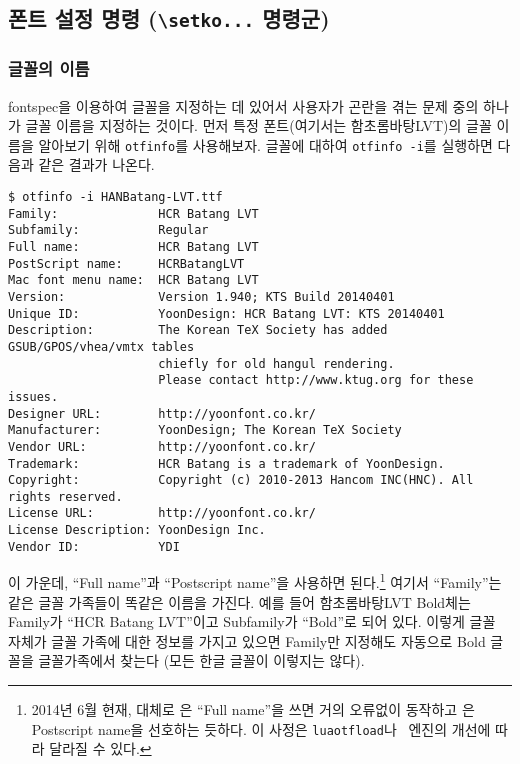 \documentclass[
	12pt,
	a4paper,
	kosection,
	footnote,
	nobookmarks,
	microtype,
]{oblivoir}
\def\cs#1{\texttt{\textbackslash #1}}
\def\util#1{\texttt{#1}}
\def\ct#1{\texttt{#1}}
\newcommand\obclass{ob\-liv\-oir\oblivoirallowbreak}
\begin{document}
\subsection{ 폰트 설정 명령 (\protect\cs{setko...} 명령군)}

\subsubsection{글꼴의 이름}
fontspec을 이용하여 글꼴을 지정하는 데 있어서 사용자가 곤란을 겪는 문제 중의 하나가 글꼴 이름을 
지정하는 것이다. 먼저 특정 폰트(여기서는 함초롬바탕LVT)의 글꼴 이름을 알아보기 위해 \util{otfinfo}를
사용해보자. 글꼴에 대하여 \util{otfinfo -i}를 실행하면 다음과 같은 결과가 나온다.

\begin{footnotesize}
\begin{verbatim}
$ otfinfo -i HANBatang-LVT.ttf
Family:              HCR Batang LVT
Subfamily:           Regular
Full name:           HCR Batang LVT
PostScript name:     HCRBatangLVT
Mac font menu name:  HCR Batang LVT
Version:             Version 1.940; KTS Build 20140401
Unique ID:           YoonDesign: HCR Batang LVT: KTS 20140401
Description:         The Korean TeX Society has added GSUB/GPOS/vhea/vmtx tables 
                     chiefly for old hangul rendering. 
                     Please contact http://www.ktug.org for these issues.
Designer URL:        http://yoonfont.co.kr/
Manufacturer:        YoonDesign; The Korean TeX Society
Vendor URL:          http://yoonfont.co.kr/
Trademark:           HCR Batang is a trademark of YoonDesign.
Copyright:           Copyright (c) 2010-2013 Hancom INC(HNC). All rights reserved.
License URL:         http://yoonfont.co.kr/
License Description: YoonDesign Inc.
Vendor ID:           YDI
\end{verbatim}
\end{footnotesize}
이 가운데, ``Full name''과 ``Postscript name''을 사용하면 된다.\footnote{%
	2014년 6월 현재, 대체로 \XeTeX 은 ``Full name''을 쓰면 거의 오류없이 동작하고
	\LuaTeX 은 Postscript name을 선호하는 듯하다. 이 사정은 \ct{luaotfload}나
	\XeTeX\ 엔진의 개선에 따라 달라질 수 있다.}
여기서 ``Family''는 같은 글꼴 가족들이 똑같은 이름을 가진다. 예를 들어 함초롬바탕LVT Bold체는
Family가 ``HCR Batang LVT''이고 Subfamily가 ``Bold''로 되어 있다. 이렇게 글꼴 자체가 글꼴 가족에 대한 정보를 가지고 있으면 Family만 지정해도 자동으로 Bold 글꼴을 글꼴가족에서 찾는다 (모든 한글 글꼴이 이렇지는 않다).
\end{document}
